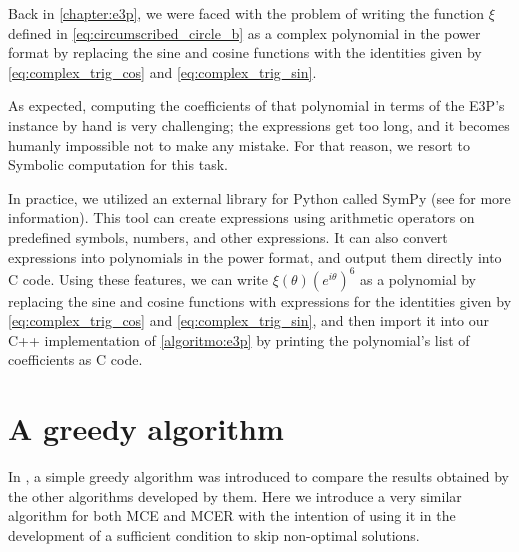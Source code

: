 Back in \autoref{chapter:e3p}, we were faced with the problem of writing the function $\xi$ defined in \autoref{eq:circumscribed_circle_b} as a complex polynomial in the power format by replacing the sine and cosine functions with the identities given by  \autoref{eq:complex_trig_cos} and \autoref{eq:complex_trig_sin}.

As expected, computing the coefficients of that polynomial in terms of the E3P's instance by hand is very challenging; the expressions get too long, and it becomes humanly impossible not to make any mistake. 
For that reason, we resort to Symbolic computation for this task.

In practice, we utilized an external library for Python called SymPy (see  for more information).
This tool can create expressions using arithmetic operators on predefined symbols, numbers, and other expressions. It can also convert expressions into polynomials in the power format, and output them directly into C code. Using these features, we can write $\xi(\theta)(e^{i\theta})^6$ as a polynomial by replacing the sine and cosine functions with expressions for the identities given by  \autoref{eq:complex_trig_cos} and \autoref{eq:complex_trig_sin}, and then import it into our C++ implementation of \autoref{algoritmo:e3p} by printing the polynomial's list of coefficients as C code.



\section{A greedy algorithm}

In , a simple greedy algorithm was introduced to compare the results obtained by the other algorithms developed by them. 
Here we introduce a very similar algorithm for both MCE and MCER with the intention of using it in the development of a sufficient condition to skip non-optimal solutions.

